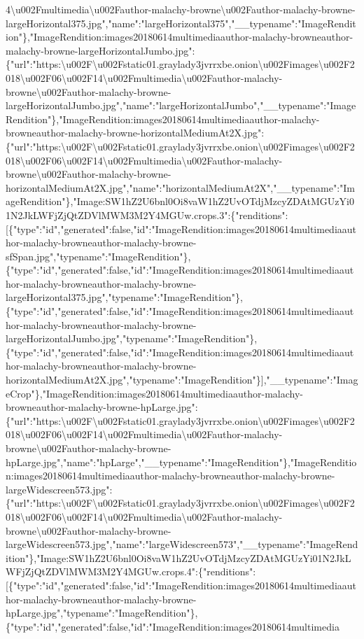 4\textbackslash{}u002Fmultimedia\textbackslash{}u002Fauthor-malachy-browne\textbackslash{}u002Fauthor-malachy-browne-largeHorizontal375.jpg","name":"largeHorizontal375","\_\_typename":"ImageRendition"\},"ImageRendition:images20180614multimediaauthor-malachy-browneauthor-malachy-browne-largeHorizontalJumbo.jpg":\{"url":"https:\textbackslash{}u002F\textbackslash{}u002Fstatic01.graylady3jvrrxbe.onion\textbackslash{}u002Fimages\textbackslash{}u002F2018\textbackslash{}u002F06\textbackslash{}u002F14\textbackslash{}u002Fmultimedia\textbackslash{}u002Fauthor-malachy-browne\textbackslash{}u002Fauthor-malachy-browne-largeHorizontalJumbo.jpg","name":"largeHorizontalJumbo","\_\_typename":"ImageRendition"\},"ImageRendition:images20180614multimediaauthor-malachy-browneauthor-malachy-browne-horizontalMediumAt2X.jpg":\{"url":"https:\textbackslash{}u002F\textbackslash{}u002Fstatic01.graylady3jvrrxbe.onion\textbackslash{}u002Fimages\textbackslash{}u002F2018\textbackslash{}u002F06\textbackslash{}u002F14\textbackslash{}u002Fmultimedia\textbackslash{}u002Fauthor-malachy-browne\textbackslash{}u002Fauthor-malachy-browne-horizontalMediumAt2X.jpg","name":"horizontalMediumAt2X","\_\_typename":"ImageRendition"\},"Image:SW1hZ2U6bnl0Oi8vaW1hZ2UvOTdjMzcyZDAtMGUzYi01N2JkLWFjZjQtZDVlMWM3M2Y4MGUw.crops.3":\{"renditions":{[}\{"type":"id","generated":false,"id":"ImageRendition:images20180614multimediaauthor-malachy-browneauthor-malachy-browne-sfSpan.jpg","typename":"ImageRendition"\},\{"type":"id","generated":false,"id":"ImageRendition:images20180614multimediaauthor-malachy-browneauthor-malachy-browne-largeHorizontal375.jpg","typename":"ImageRendition"\},\{"type":"id","generated":false,"id":"ImageRendition:images20180614multimediaauthor-malachy-browneauthor-malachy-browne-largeHorizontalJumbo.jpg","typename":"ImageRendition"\},\{"type":"id","generated":false,"id":"ImageRendition:images20180614multimediaauthor-malachy-browneauthor-malachy-browne-horizontalMediumAt2X.jpg","typename":"ImageRendition"\}{]},"\_\_typename":"ImageCrop"\},"ImageRendition:images20180614multimediaauthor-malachy-browneauthor-malachy-browne-hpLarge.jpg":\{"url":"https:\textbackslash{}u002F\textbackslash{}u002Fstatic01.graylady3jvrrxbe.onion\textbackslash{}u002Fimages\textbackslash{}u002F2018\textbackslash{}u002F06\textbackslash{}u002F14\textbackslash{}u002Fmultimedia\textbackslash{}u002Fauthor-malachy-browne\textbackslash{}u002Fauthor-malachy-browne-hpLarge.jpg","name":"hpLarge","\_\_typename":"ImageRendition"\},"ImageRendition:images20180614multimediaauthor-malachy-browneauthor-malachy-browne-largeWidescreen573.jpg":\{"url":"https:\textbackslash{}u002F\textbackslash{}u002Fstatic01.graylady3jvrrxbe.onion\textbackslash{}u002Fimages\textbackslash{}u002F2018\textbackslash{}u002F06\textbackslash{}u002F14\textbackslash{}u002Fmultimedia\textbackslash{}u002Fauthor-malachy-browne\textbackslash{}u002Fauthor-malachy-browne-largeWidescreen573.jpg","name":"largeWidescreen573","\_\_typename":"ImageRendition"\},"Image:SW1hZ2U6bnl0Oi8vaW1hZ2UvOTdjMzcyZDAtMGUzYi01N2JkLWFjZjQtZDVlMWM3M2Y4MGUw.crops.4":\{"renditions":{[}\{"type":"id","generated":false,"id":"ImageRendition:images20180614multimediaauthor-malachy-browneauthor-malachy-browne-hpLarge.jpg","typename":"ImageRendition"\},\{"type":"id","generated":false,"id":"ImageRendition:images20180614multimedia